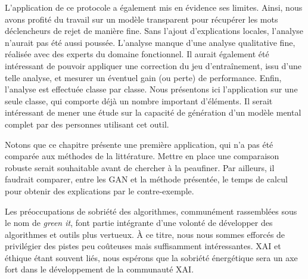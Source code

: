 L'application de ce protocole a également mis en évidence ses limites.
Ainsi, nous avons profité du travail sur un modèle transparent pour récupérer les mots déclencheurs de rejet de manière fine. Sans l'ajout d’explications locales, l'analyse n'aurait pas été aussi poussée.
L'analyse manque d'une analyse qualitative fine, réalisée avec des experts du domaine fonctionnel. Il aurait également été intéressant de pouvoir appliquer une correction du jeu d'entraînement, issu d'une telle analyse, et mesurer un éventuel gain (ou perte) de performance.
Enfin, l'analyse est effectuée classe par classe. Nous présentons ici l'application sur une seule classe, qui comporte déjà un nombre important d'éléments. Il serait intéressant de mener une étude sur la capacité de génération d'un modèle mental complet par des personnes utilisant cet outil.

Notons que ce chapitre présente une première application, qui n'a pas été comparée aux méthodes de la littérature. Mettre en place une comparaison robuste serait souhaitable avant de chercher à la peaufiner.
Par ailleurs, il faudrait comparer, entre les GAN et la méthode présentée, le temps de calcul pour obtenir des explications par le contre-exemple.

Les préoccupations de sobriété des algorithmes, communément rassemblées sous le nom de \textit{green it}, font partie intégrante d'une volonté de développer des algorithmes et outils plus vertueux. \`A ce titre, nous nous sommes efforcés de privilégier des pistes peu coûteuses mais suffisamment intéressantes.
XAI et éthique étant souvent liés, nous espérons que la sobriété énergétique sera un axe fort dans le développement de la communauté XAI.

